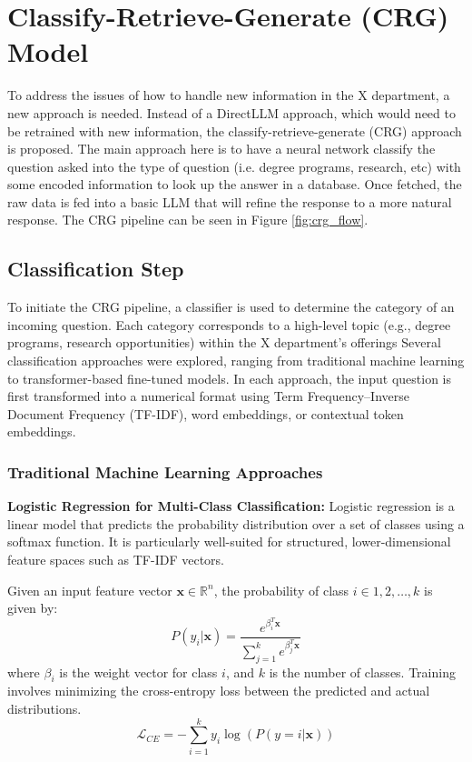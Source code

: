 \documentclass[conference]{IEEEtran}
\begin{document}
\section{Classify-Retrieve-Generate (CRG) Model}
To address the issues of how to handle new information in the X department, a new approach is needed. 
Instead of a DirectLLM approach, which would need to be retrained with new information, the classify-retrieve-generate (CRG) approach is proposed. 
The main approach here is to have a neural network classify the question asked into the type of question (i.e. degree programs, research, etc) with some encoded information to look up the answer in a database. 
Once fetched, the raw data is fed into a basic LLM that will refine the response to a more natural response.
The CRG pipeline can be seen in Figure \ref{fig:crg_flow}.

\subsection{Classification Step}
To initiate the CRG pipeline, a classifier is used to determine the category of an incoming question. 
Each category corresponds to a high-level topic (e.g., degree programs, research opportunities) within the X department's offerings
Several classification approaches were explored, ranging from traditional machine learning to transformer-based fine-tuned models. 
In each approach, the input question is first transformed into a numerical format using Term Frequency–Inverse Document Frequency (TF-IDF), word embeddings, or contextual token embeddings.

\subsubsection{Traditional Machine Learning Approaches}
\textbf{Logistic Regression for Multi-Class Classification:}
Logistic regression is a linear model that predicts the probability distribution over a set of classes using a softmax function. 
It is particularly well-suited for structured, lower-dimensional feature spaces such as TF-IDF vectors.

Given an input feature vector $\mathbf{x}\in \mathbb{R}^n$, the probability of class $i\in{1,2,\ldots,k}$ is given by:
\begin{equation}
    P(y_i | \mathbf{x}) = \frac{e^{\beta_i^T \mathbf{x}}}{\sum_{j=1}^{k} e^{\beta_j^T \mathbf{x}}}
\end{equation}
where $\beta_i$ is the weight vector for class $i$, and $k$ is the number of classes.
Training involves minimizing the cross-entropy loss between the predicted and actual distributions.
\begin{equation}
    \mathcal{L}_{CE} = -\sum_{i=1}^{k} y_i \log(P(y=i | \mathbf{x}))
\end{equation}
\end{document}
